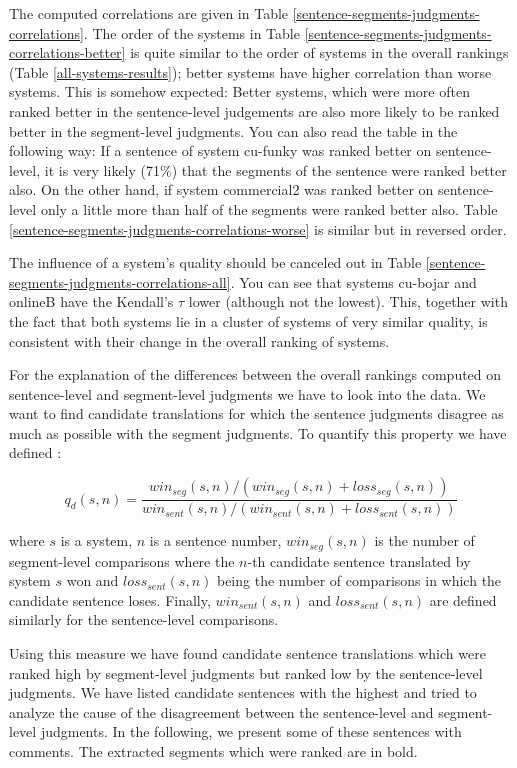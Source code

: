 The computed correlations are given in Table
\ref{sentence-segments-judgments-correlations}. The order of the systems in
Table \ref{sentence-segments-judgments-correlations-better} is quite similar to
the order of systems in the overall rankings (Table \ref{all-systems-results});
better systems have higher correlation than worse systems.  This is somehow
expected: Better systems, which were more often ranked better in the
sentence-level judgements are also more likely to be ranked better in the
segment-level judgments.  You can also read the table in the following way: If
a sentence of system cu-funky was ranked better on sentence-level, it is very
likely (71\%) that the segments of the sentence were ranked better also. On the
other hand, if system commercial2 was ranked better on sentence-level only a
little more than half of the segments were ranked better also. Table
\ref{sentence-segments-judgments-correlations-worse} is similar but in reversed
order.

The influence of a system's quality should be canceled out in Table
\ref{sentence-segments-judgments-correlations-all}. You can see that systems
cu-bojar and onlineB have the Kendall's $\tau$ lower (although not the lowest).
This, together with the fact that both systems lie in a cluster of systems of
very similar quality, is consistent with their change in the overall ranking of
systems. 

For the explanation of the differences between the overall rankings computed on
sentence-level and segment-level judgments we have to look into the data. We
want to find candidate translations for which the sentence judgments disagree as
much as possible with the segment judgments. To quantify this property we have
defined :

\begin{equation*}
  q_d(s,n) = \frac{
    win_{seg}(s,n) / (win_{seg}(s,n) + loss_{seg}(s,n))
  }{
    win_{sent}(s,n)/(win_{sent}(s,n) + loss_{sent}(s,n))
  }
\end{equation*}

\noindent where $s$ is a system, $n$ is a sentence number, $win_{seg}(s,n)$ is
the number of segment-level comparisons where the $n$-th candidate sentence
translated by system $s$ won and $loss_{sent}(s,n)$ being the number of
comparisons in which the candidate sentence loses. Finally, $win_{sent}(s,n)$
and $loss_{sent}(s,n)$ are defined similarly for the sentence-level
comparisons.

Using this measure we have found candidate sentence translations which were
ranked high by segment-level judgments but ranked low by the sentence-level
judgments.  We have listed candidate sentences with the highest
 and tried to analyze the cause of the
disagreement between the sentence-level and segment-level judgments. In the
following, we present some of these sentences with comments. The extracted
segments which were ranked are in bold.

